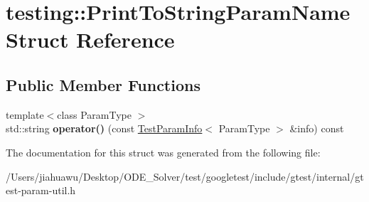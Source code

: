 \hypertarget{structtesting_1_1_print_to_string_param_name}{}\section{testing\+:\+:Print\+To\+String\+Param\+Name Struct Reference}
\label{structtesting_1_1_print_to_string_param_name}
\subsection*{Public Member Functions}
\begin{DoxyCompactItemize}
\item 
\mbox{\label{structtesting_1_1_print_to_string_param_name_a05b411cfb75dadb2c3c0355aee1dcf21}} 
{\footnotesize template$<$class Param\+Type $>$ }\\std\+::string {\bfseries operator()} (const \mbox{\hyperlink{structtesting_1_1_test_param_info}{Test\+Param\+Info}}$<$ Param\+Type $>$ \&info) const
\end{DoxyCompactItemize}


The documentation for this struct was generated from the following file\+:\begin{DoxyCompactItemize}
\item 
/\+Users/jiahuawu/\+Desktop/\+O\+D\+E\+\_\+\+Solver/test/googletest/include/gtest/internal/gtest-\/param-\/util.\+h\end{DoxyCompactItemize}
